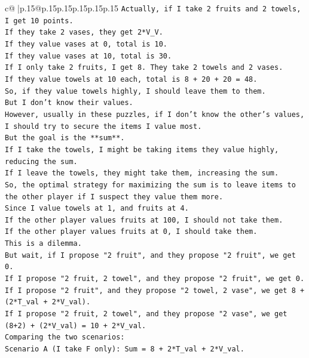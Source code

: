 \documentclass{article}
\begin{document}
{\begin{supertabular}{c@{$\;$}|p{.15\linewidth}@{}p{.15\linewidth}p{.15\linewidth}p{.15\linewidth}p{.15\linewidth}p{.15\linewidth}}
{{{\texttt{Actually, if I take 2 fruits and 2 towels, I get 10 points.} \\
\texttt{If they take 2 vases, they get 2*V\_V.} \\
\texttt{If they value vases at 0, total is 10.} \\
\texttt{If they value vases at 10, total is 30.} \\
\texttt{If I only take 2 fruits, I get 8. They take 2 towels and 2 vases.} \\
\texttt{If they value towels at 10 each, total is 8 + 20 + 20 = 48.} \\
\texttt{So, if they value towels highly, I should leave them to them.} \\
\texttt{But I don't know their values.} \\
\texttt{However, usually in these puzzles, if I don't know the other's values, I should try to secure the items I value most.} \\
\texttt{But the goal is the **sum**.} \\
\texttt{If I take the towels, I might be taking items they value highly, reducing the sum.} \\
\texttt{If I leave the towels, they might take them, increasing the sum.} \\
\texttt{So, the optimal strategy for maximizing the sum is to leave items to the other player if I suspect they value them more.} \\
\texttt{Since I value towels at 1, and fruits at 4.} \\
\texttt{If the other player values fruits at 100, I should not take them.} \\
\texttt{If the other player values fruits at 0, I should take them.} \\
\texttt{This is a dilemma.} \\
\texttt{But wait, if I propose "2 fruit", and they propose "2 fruit", we get 0.} \\
\texttt{If I propose "2 fruit, 2 towel", and they propose "2 fruit", we get 0.} \\
\texttt{If I propose "2 fruit", and they propose "2 towel, 2 vase", we get 8 + (2*T\_val + 2*V\_val).} \\
\texttt{If I propose "2 fruit, 2 towel", and they propose "2 vase", we get (8+2) + (2*V\_val) = 10 + 2*V\_val.} \\
\texttt{Comparing the two scenarios:} \\
\texttt{Scenario A (I take F only): Sum = 8 + 2*T\_val + 2*V\_val.} \\
}}}
\end{supertabular}}
\end{document}
